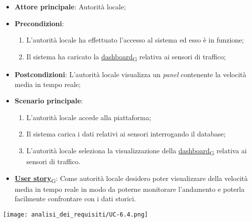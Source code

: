 \begin{itemize}
	\item \textbf{Attore principale}: Autorità locale;
	\item \textbf{Precondizioni}:
	      \begin{enumerate}
		      \item L'autorità locale ha effettuato l'accesso al sistema ed esso è in funzione;
		      \item Il sistema ha caricato la \href{https://7last.github.io/docs/rtb/documentazione-interna/glossario\#dashboard}{dashboard\textsubscript{G}} relativa ai sensori di traffico;
	      \end{enumerate}
	\item \textbf{Postcondizioni}: L'autorità locale visualizza un \textit{panel} contenente la velocità media in tempo reale;
	\item \textbf{Scenario principale}:
	      \begin{enumerate}
		      \item L'autorità locale accede alla piattaforma;
		      \item Il sistema carica i dati relativi ai sensori interrogando il database;
		      \item L'autorità locale seleziona la visualizzazione della \href{https://7last.github.io/docs/rtb/documentazione-interna/glossario\#dashboard}{dashboard\textsubscript{G}} relativa ai sensori di traffico.
	      \end{enumerate}
	\item \href{https://7last.github.io/docs/rtb/documentazione-interna/glossario\#user-story}{\textbf{User story}\textsubscript{G}}:
	      Come autorità locale desidero poter visualizzare della velocità media in tempo reale in modo da poterne monitorare l'andamento
	      e poterla facilmente confrontare con i dati storici.
\end{itemize}
\begin{center}
	\texttt{[image: analisi\_dei\_requisiti/UC-6.4.png]}
\end{center}

